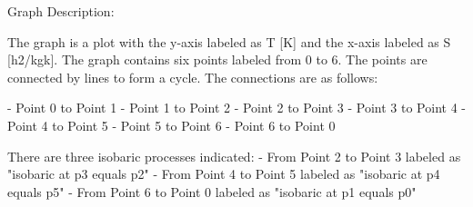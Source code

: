 Graph Description:

The graph is a plot with the y-axis labeled as T [K] and the x-axis labeled as S [h2/kgk]. The graph contains six points labeled from 0 to 6. The points are connected by lines to form a cycle. The connections are as follows:

- Point 0 to Point 1
- Point 1 to Point 2
- Point 2 to Point 3
- Point 3 to Point 4
- Point 4 to Point 5
- Point 5 to Point 6
- Point 6 to Point 0

There are three isobaric processes indicated:
- From Point 2 to Point 3 labeled as "isobaric at p3 equals p2"
- From Point 4 to Point 5 labeled as "isobaric at p4 equals p5"
- From Point 6 to Point 0 labeled as "isobaric at p1 equals p0"